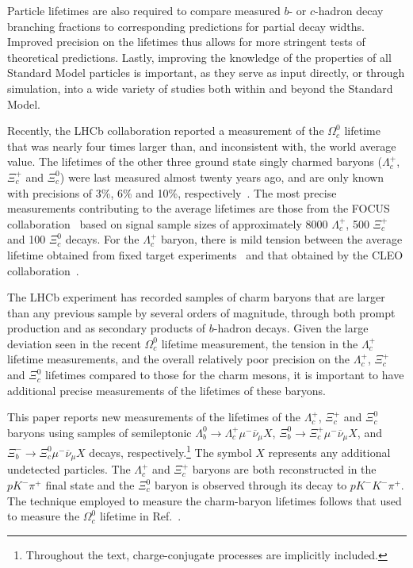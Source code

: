 \documentclass[12pt,a4paper]{article}
\def\Pmu         {\ensuremath{\upmu}\xspace}
\def\Pnu         {\ensuremath{\upnu}\xspace}
\def\Ppi         {\ensuremath{\uppi}\xspace}
\def\PXi         {\ensuremath{\Xi}\xspace}
\def\PLambda     {\ensuremath{\Lambda}\xspace}
\def\POmega      {\ensuremath{\Omega}\xspace}
\def\PK      {\ensuremath{\mathrm{K}}\xspace}
\def\Pb      {\ensuremath{\mathrm{b}}\xspace}
\def\Pc      {\ensuremath{\mathrm{c}}\xspace}
\def\Pmu         {\ensuremath{\mu}\xspace}
\def\Pnu         {\ensuremath{\nu}\xspace}
\def\Ppi         {\ensuremath{\pi}\xspace}
\def\PK      {\ensuremath{K}\xspace}
\def\Pb      {\ensuremath{b}\xspace}
\def\Pc      {\ensuremath{c}\xspace}
\def\mun        {{\ensuremath{\Pmu^-}}\xspace} \def\mupm       {{\ensuremath{\Pmu^\pm}}\xspace}
\def\neub       {{\ensuremath{\overline{\Pnu}}}\xspace}
\def\neumb      {{\ensuremath{\neub_\mu}}\xspace}
\def\cquark    {{\ensuremath{\Pc}}\xspace}
\def\bquark    {{\ensuremath{\Pb}}\xspace}
\def\pion   {{\ensuremath{\Ppi}}\xspace}
\def\pip    {{\ensuremath{\pion^+}}\xspace}
\def\kaon    {{\ensuremath{\PK}}\xspace}
\def\Km      {{\ensuremath{\kaon^-}}\xspace}
\def\Lz          {{\ensuremath{\PLambda}}\xspace}
\def\Xires       {{\ensuremath{\PXi}}\xspace}
\def\Omegares    {{\ensuremath{\POmega}}\xspace}
\def\Lc          {{\ensuremath{\Lz^+_\cquark}}\xspace}
\def\Xicz        {{\ensuremath{\Xires^0_\cquark}}\xspace}
\def\Xicp        {{\ensuremath{\Xires^+_\cquark}}\xspace}
\def\Omegac      {{\ensuremath{\Omegares^0_\cquark}}\xspace}
\def\Lb           {{\ensuremath{\Lz^0_\bquark}}\xspace}
\def\Xibz         {{\ensuremath{\Xires^0_\bquark}}\xspace}
\def\Xibm         {{\ensuremath{\Xires^-_\bquark}}\xspace}
\def\to                 {\ensuremath{\rightarrow}\xspace}
\begin{document}
Particle lifetimes are also required to compare measured $b$- or $c$-hadron decay branching fractions to 
corresponding predictions for partial decay widths. Improved precision on the lifetimes thus allows for 
more stringent tests of theoretical predictions. Lastly, improving the knowledge of the properties of all Standard Model particles
is important, as they serve as input directly, or through simulation, into a wide variety of studies both within and 
beyond the Standard Model.

Recently, the LHCb collaboration reported a measurement of the $\Omegac$ lifetime~\cite{LHCb-PAPER-2018-028} that was nearly four times 
larger than, and inconsistent with, the world average value. The lifetimes of the other three ground state singly charmed baryons 
($\Lc$, $\Xicp$ and $\Xicz$) were last measured 
almost twenty years ago, and are only known with precisions of 3\%, 6\% and 10\%, respectively~\cite{PDG2018}. 
The most precise measurements contributing to the average lifetimes are those from the FOCUS 
collaboration~\cite{Link:2002ge,Link:2001qy,Link:2002xu} based on signal sample sizes of approximately 8000 $\Lc$, 500 $\Xicp$ and 100 $\Xicz$ decays. 
For the $\Lc$ baryon, there is mild tension between the average lifetime obtained from fixed target experiments~\cite{Link:2002ge,Kushnirenko:2000ed,Frabetti:1992jx} 
and that obtained by the CLEO collaboration~\cite{Mahmood:2000tw}. 

The LHCb experiment has recorded samples of charm baryons that are
larger than any previous sample by several orders of magnitude, through both prompt production and as secondary products
of $b$-hadron decays. Given the large deviation seen in the recent $\Omegac$ lifetime
measurement, the tension in the $\Lc$ lifetime measurements, and the overall relatively poor precision on the $\Lc$, $\Xicp$ and $\Xicz$ lifetimes compared 
to those for the charm mesons, it is important to have additional precise measurements of the lifetimes of these baryons.

This paper reports new measurements of the lifetimes of the $\Lc$, $\Xicp$ and $\Xicz$ baryons using samples of
semileptonic $\Lb\to\Lc\mun\neumb X$, $\Xibz\to\Xicp\mun\neumb X$, and $\Xibm\to\Xicz\mun\neumb X$ decays, 
respectively.\footnote{Throughout the text, charge-conjugate processes are implicitly included.}
The symbol $X$ represents any additional undetected particles. 
The $\Lc$ and $\Xicp$ baryons are both reconstructed in the $p\Km\pip$ final state and the $\Xicz$ baryon is observed through its decay to $p\Km\Km\pip$.
The technique employed to measure the charm-baryon lifetimes
follows that used to measure the $\Omegac$ lifetime in Ref.~\cite{LHCb-PAPER-2018-028}.
\end{document}
